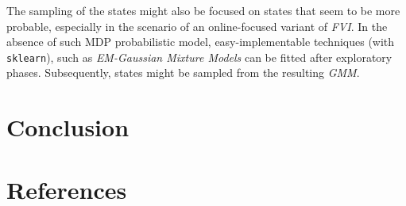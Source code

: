 \documentclass[a4paper, 12pt]{article}
\begin{document}
The sampling of the states might also be focused on states that 
seem to be more probable, especially in the scenario of 
an online-focused variant
of \emph{FVI}. In the absence of such MDP probabilistic model,
easy-implementable techniques (with \texttt{sklearn}), such as
\emph{EM-Gaussian Mixture Models} can be fitted
after exploratory phases. Subsequently,
states might be sampled from the resulting \emph{GMM}.

\section*{Conclusion}

\section*{References}


\end{document}
